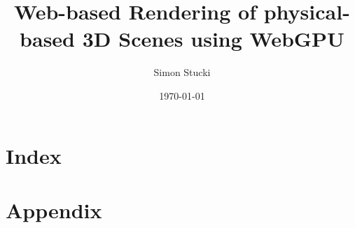 \documentclass[a4paper, 11pt,abstract=on, listof=totocnumbered]{scrreprt}
\title{Web-based Rendering of physical-based 3D Scenes using WebGPU}
\author{Simon Stucki}
\date{\today}
\begin{document}
% 

\clearpage
\setcounter{page}{1}


%

%

%

\renewcommand{\contentsname}{Contents}
\tableofcontents

%

%

%

%

%

\chapter{Index}


\appendix
\chapter{Appendix}
\label{ch:appendix}
%
\end{document}
